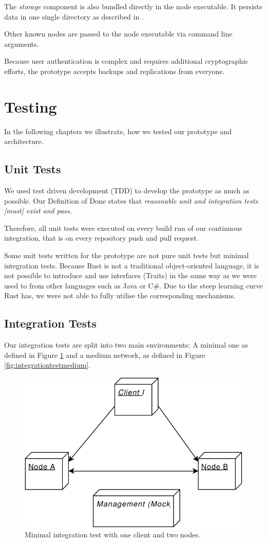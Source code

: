 The \emph{storage} component is also bundled directly in the node executable. It persists data in one single directory as described in .

Other known nodes are passed to the node executable via command line arguments.

Because user authentication is complex and requires additional cryptographic efforts, the prototype accepts backups and replications from everyone.

\section{Testing}\label{testing}

In the following chapters we illustrate, how we tested our prototype and architecture.

\subsection{Unit Tests}\label{unit-tests}
We used test driven development (TDD) to develop the prototype as much as possible. Our Definition of Done\cite{project-plan} states that \emph{reasonable unit and integration tests [must] exist and pass.}

Therefore, all unit tests were executed on every build run of our continuous integration, that is on every repository push and pull request.

Some unit tests written for the prototype are not pure unit tests but minimal integration tests. Because Rust is not a traditional object-oriented language, it is not possible to introduce and use interfaces (Traits) in the same way as we were used to from other languages such as Java or C\#. Due to the steep learning curve Rust has, we were not able to fully utilise the corresponding mechanisms.

\subsection{Integration Tests}\label{integration-tests}

Our integration tests are split into two main environments: A minimal one as defined in Figure \ref{fig:integrationtestsmall} and a medium network, as defined in Figure \ref{fig:integrationtestmedium}.

\begin{figure}
	\centering
	\includegraphics[width=0.5\linewidth]{resources/integration_test_small}
	\caption[Minimal integration test]{Minimal integration test with one client and two nodes.}
	\label{fig:integrationtestsmall}
\end{figure}

